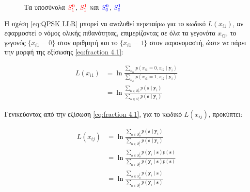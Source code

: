 \begin{figure}[h]
\caption{Τα υποσύνολα $ \color{red} {S}_1^0$, $ \color{red} {S}_1^1$ και $ \color{blue} {S}_0^0$, $ \color{blue}{S}_0^1$}
\label{fig:qpsk subtotals}
\end{figure}

Η σχέση \ref{eq:QPSK LLR} μπορεί να αναλυθεί περεταίρω για το κωδικό  $L(x_{i1})$, αν εφαρμοστεί ο νόμος ολικής πιθανότητας, επιμερίζοντας σε όλα τα γεγονότα $x_{i2}$, το γεγονός $\{x_{i1}=0\}$ στον αριθμητή και το $\{x_{i1}=1\}$ στον παρονομαστή, ώστε να πάρει την μορφή της εξίσωσης \ref{eq:fraction 4.1}:

\begin{equation}
\begin{split}
L(x_{i1}) & =\ln\frac{\sum\nolimits_{x_{i2}}p(x_{i1}=0, x_{i2}\mid\mathbf{y}_i)}{\sum\nolimits_{x_{i2}}p(x_{i1}=1, x_{i2}\mid\mathbf{y}_i)} \\
& = \ln\frac{\sum\nolimits_{\mathbf{s}\in{S}_0^1} p(\mathbf{s}\mid\mathbf{y}_i)}{\sum\nolimits_{\mathbf{s}\in{S}_1^1} p(\mathbf{s}\mid\mathbf{y}_i)}
\end{split}
\label{eq:fraction 4.1}
\end{equation}

Γενικεύοντας από την εξίσωση \ref{eq:fraction 4.1}, για το κωδικό  $L(x_{ij})$, προκύπτει:

\begin{equation}
\begin{split}
L(x_{ij}) & = \ln\frac{\sum\nolimits_{\mathbf{s}\in{S}_0^j} p(\mathbf{s}\mid\mathbf{y}_i)}{\sum\nolimits_{\mathbf{s}\in{S}_1^j} p(\mathbf{s}\mid\mathbf{y}_i)} \\
& = \ln\frac{\sum\nolimits_{\mathbf{s}\in{S}_0^j} p(\mathbf{y}_i\mid\mathbf{s})p(\mathbf{s})}{\sum\nolimits_{\mathbf{s}\in{S}_1^j} p(\mathbf{y}_i\mid\mathbf{s})p(\mathbf{s})} \\
& = \ln\frac{\sum\nolimits_{\mathbf{s}\in{S}_0^j} p(\mathbf{y}_i\mid\mathbf{s})}{\sum\nolimits_{\mathbf{s}\in{S}_1^j} p(\mathbf{y}_i\mid\mathbf{s})}
\end{split}
\label{eq:fraction 4.2}
\end{equation}

